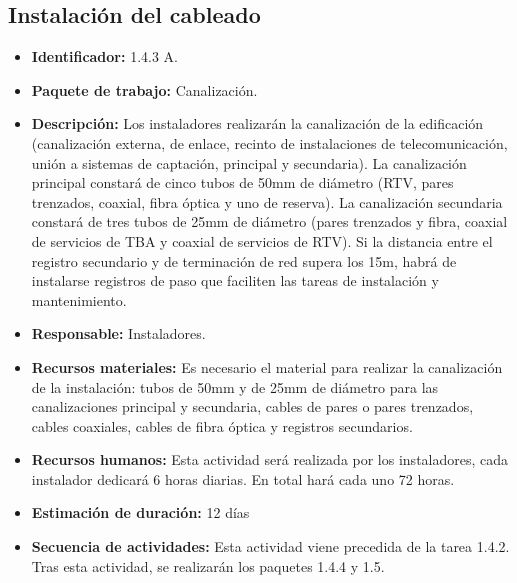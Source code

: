 \subsection{Instalación del cableado}
\begin{itemize}
\item \textbf{Identificador: }1.4.3 A.
\item \textbf{Paquete de trabajo: }Canalización.
\item \textbf{Descripción: }Los instaladores realizarán la canalización de la edificación (canalización externa, de enlace, recinto de instalaciones de telecomunicación, unión a sistemas de captación, principal y secundaria). La canalización principal constará de cinco tubos de 50mm de diámetro (RTV, pares trenzados, coaxial, fibra óptica y uno de reserva). La canalización secundaria constará de tres tubos de 25mm de diámetro (pares trenzados y fibra, coaxial de servicios de TBA y coaxial de servicios de RTV). Si la distancia entre el registro secundario y de terminación de red supera los 15m, habrá de instalarse registros de paso que faciliten las tareas de instalación y mantenimiento.
\item \textbf{Responsable: }Instaladores.
\item \textbf{Recursos materiales: } Es necesario el material para realizar la canalización de la instalación: tubos de 50mm y de 25mm de diámetro para las canalizaciones principal y secundaria, cables de pares o pares trenzados, cables coaxiales, cables de fibra óptica y registros secundarios.
\item \textbf{Recursos humanos: }Esta actividad será realizada por los instaladores, cada instalador dedicará 6 horas diarias. En total hará cada uno 72 horas.
\item \textbf{Estimación de duración: }12 días
\item \textbf{Secuencia de actividades: }Esta actividad viene precedida de la tarea 1.4.2. Tras esta actividad, se realizarán los paquetes 1.4.4 y 1.5.
\end{itemize}

